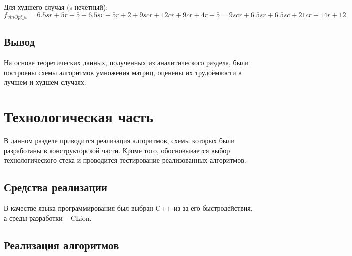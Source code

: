 \documentclass[12pt]{report}
\begin{document}
Для худшего случая (s нечётный): 
\begin{equation}
f_{vinOpt\_w} = 6.5sr + 5r + 5 + 6.5sс + 5r + 2 + 9scr + 12cr + 9cr + 4r + 5 = 9scr + 6.5sr + 6.5sc + 21cr + 14r + 12.
\end{equation}

\section{Вывод}
	На основе теоретических данных, полученных из аналитического раздела, были построены схемы алгоритмов умножения матриц, оценены их трудоёмкости в лучшем и худшем случаях.

\chapter{Технологическая часть}
В данном разделе приводится реализация алгоритмов, схемы которых были разработаны в конструкторской части. Кроме того, обосновывается выбор технологического стека и проводится тестирование реализованных алгоритмов.
\section{Средства реализации}

В качестве языка программирования был выбран C++ из-за его быстродействия, а среды разработки -- CLion.

\section{Реализация алгоритмов}
\end{document}
